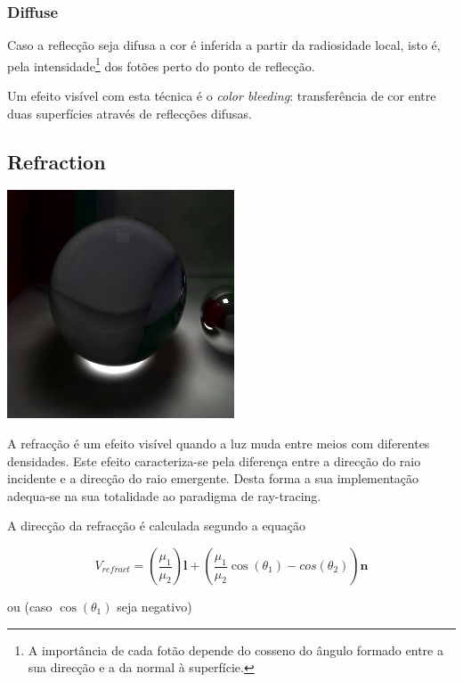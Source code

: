 \documentclass[a4paper]{article}
\begin{document}
\subsubsection{Diffuse}
\indent \indent Caso a reflecção seja difusa a cor é inferida a partir da radiosidade local,
isto é, pela intensidade\footnote{A importância de cada fotão depende do cosseno do ângulo formado entre a sua direcção e a da normal à superfície.} dos fotões perto do ponto de reflecção.

\indent Um efeito visível com esta técnica é o \emph{color bleeding}: transferência de cor entre duas superfícies
através de reflecções difusas.

\cleardoublepage
\subsection{Refraction}
\begin{center}
	\includegraphics[scale=0.50]{images/caustics.png}
	\label{fig:caustics}
\end{center}

\indent A refracção é um efeito visível quando a luz muda entre meios com diferentes densidades.
Este efeito caracteriza-se pela diferença entre a direcção do raio incidente e a direcção do raio emergente. 
Desta forma a sua implementação adequa-se na sua totalidade ao paradigma de ray-tracing.

A direcção da refracção é calculada segundo a equação

\begin{displaymath}
	V_{refract} = \left(\frac{\mu_{1}}{\mu_{2}}\right)\mathbf{l} + \left(\frac{\mu_{1}}{\mu_{2}} \cos(\theta_{1}) - cos(\theta_{2})\right)\mathbf{n}
\end{displaymath}

ou (caso $\cos(\theta_{1})$ seja negativo)
\end{document}

